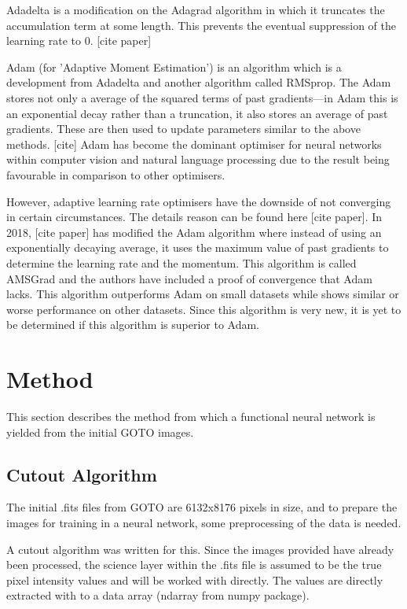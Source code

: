 \documentclass[a4paper,fleqn,usenatbib]{mnras}
\begin{document}
 Adadelta is a modification on the Adagrad algorithm in which it truncates the accumulation term at some length. This prevents the eventual suppression of the learning rate to 0. [cite paper]
 
 Adam (for 'Adaptive Moment Estimation') is an algorithm which is a development from Adadelta and another algorithm called RMSprop. The Adam stores not only a average of the squared terms of past gradients---in Adam this is an exponential decay rather than a truncation, it also stores an average of past gradients. These are then used to update parameters similar to the above methods. [cite] Adam has become the dominant optimiser for neural networks within computer vision and natural language processing due to the result being favourable in comparison to other optimisers. 
 
 However, adaptive learning rate optimisers have the downside of not converging in certain circumstances. The details reason can be found here [cite paper]. In 2018, [cite paper] has modified the Adam algorithm where instead of using an exponentially decaying average, it uses the maximum value of past gradients to determine the learning rate and the momentum. This algorithm is called AMSGrad and the authors have included a proof of convergence that Adam lacks. This algorithm outperforms Adam on small datasets while shows similar or worse performance on other datasets. Since this algorithm is very new, it is yet to be determined if this algorithm is superior to Adam.
 
 
 \section{Method}
This section describes the method from which a functional neural network is yielded from the initial GOTO images.
\subsection{Cutout Algorithm}
The initial .fits files from GOTO are 6132x8176 pixels in size, and to prepare the images for training in a neural network, some preprocessing of the data is needed. 

A cutout algorithm was written for this. Since the images provided have already been processed, the science layer within the .fits file is assumed to be the true pixel intensity values and will be worked with directly. The values are directly extracted with to a data array (ndarray from numpy package).
\end{document}

